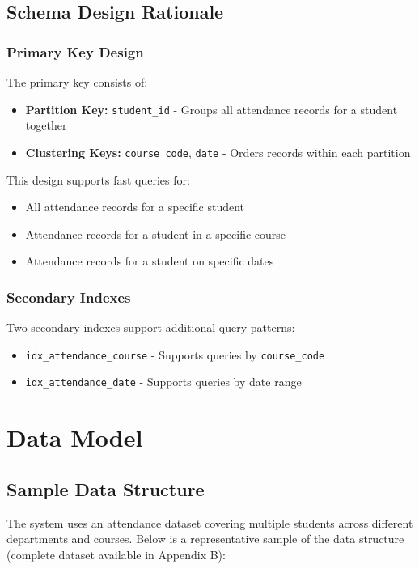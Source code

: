 \subsection{Schema Design Rationale}

\subsubsection{Primary Key Design}
The primary key consists of:
\begin{itemize}
    \item \textbf{Partition Key:} \texttt{student\_id} - Groups all attendance records for a student together
    \item \textbf{Clustering Keys:} \texttt{course\_code}, \texttt{date} - Orders records within each partition
\end{itemize}

This design supports fast queries for:
\begin{itemize}
    \item All attendance records for a specific student
    \item Attendance records for a student in a specific course
    \item Attendance records for a student on specific dates
\end{itemize}

\subsubsection{Secondary Indexes}
Two secondary indexes support additional query patterns:
\begin{itemize}
    \item \texttt{idx\_attendance\_course} - Supports queries by \texttt{course\_code}
    \item \texttt{idx\_attendance\_date} - Supports queries by date range
\end{itemize}

\section{Data Model}

\subsection{Sample Data Structure}
The system uses an attendance dataset covering multiple students across different departments and courses. Below is a representative sample of the data structure (complete dataset available in Appendix B):

